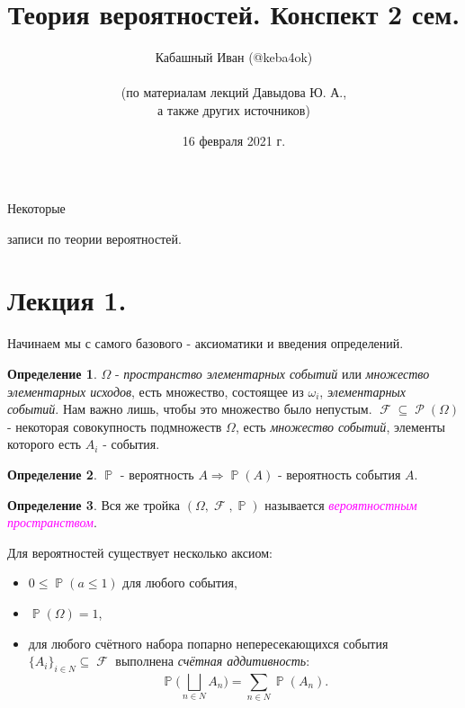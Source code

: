 \documentclass[a4paper,100pt]{article}
\title{Теория вероятностей. Конспект 2 сем.}
\author{Кабашный Иван (@keba4ok)\\ \\ (по материалам лекций Давыдова Ю. А.,\\ а также других источников)}
\date{16 февраля 2021 г.}
\theoremstyle{indented}
\theoremstyle{definition}
\newtheorem{defn}{Определение}
\theoremstyle{remark}
\DeclareMathOperator{\PP}{\mathbb{P}}
\DeclareMathOperator{\FF}{\mathcal{F}}
\DeclareMathOperator{\Rho}{\mathcal{P}}
\begin{document}
\newcommand{\resetexlcounters}{%
  \setcounter{exl}{0}%
} 

\newcommand{\resetremarkcounters}{%
  \setcounter{remark}{0}%
} 

\newcommand{\reseconscounters}{%
  \setcounter{cons}{0}%
} 

\newcommand{\resetall}{%
    \resetexlcounters
    \resetremarkcounters
    \reseconscounters%
}

\maketitle 

\newpage

\hypertarget{t1}{Некоторые} записи по теории вероятностей.
\tableofcontents

\newpage


\section{Лекция 1.}

Начинаем мы с самого базового - аксиоматики и введения определений.

\begin{defn}
    $\Omega$ - \textit{пространство элементарных событий} или \textit{множество элементарных исходов}, есть множество, состоящее из $\omega_i$, \textit{элементарных событий}. Нам важно лишь, чтобы это множество было непустым. $\FF\subseteq \Rho(\Omega)$ - некоторая совокупность подмножеств $\Omega$, есть \textit{множество событий}, элементы которого есть $A_i$ - события.
\end{defn}

\begin{defn}
    $\PP$ - вероятность $A\Rightarrow \PP(A)$ - вероятность события $A$.
\end{defn}

\begin{defn}
    Вся же тройка $(\Omega, \FF, \PP)$ называется \hypertarget{n1}{\textcolor{magenta}{\textit{вероятностным пространством}}}.
\end{defn}

Для вероятностей существует несколько аксиом: 

\begin{itemize}
    \item $0\leq \PP(a\leq 1)$ для любого события, 
    \item $\PP(\Omega)=1$, 
    \item для любого счётного набора попарно непересекающихся события $\{A_i\}_{i\in N}\subseteq\FF$ выполнена \textit{счётная аддитивность}:
    \[
        \PP\biggl( \bigsqcup_{n\in N} A_n\biggr)=\sum_{n\in N}\PP(A_n).
    \]
\end{itemize}
\end{document}
